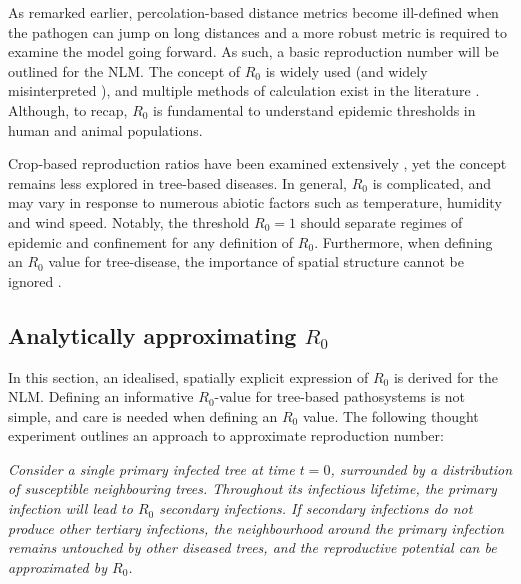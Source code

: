 As remarked earlier, percolation-based distance metrics become ill-defined when the pathogen can jump on long distances and a more robust metric is required to examine the model going forward.
As such, a basic reproduction number will be outlined for the NLM.
The concept of $R_0$ is widely used (and widely misinterpreted \cite{delamater2019complexity}),
and multiple methods of calculation exist in the literature \cite{perspectives-on-r0}.
Although, to recap, $R_0$ is fundamental to understand epidemic thresholds in human and animal populations. 

Crop-based reproduction ratios have been examined extensively
\cite{gubbins2000population, park2001invasion, doi:10.1146/annurev.phyto.011108.135838, van2011periodic},
yet the concept remains less explored in tree-based diseases. 
In general, $R_0$ is complicated, and may vary in response to numerous abiotic factors such as temperature, humidity and wind speed.
Notably, the threshold $R_0=1$ should separate regimes of epidemic and confinement for any definition of $R_0$.
Furthermore, when defining an $R_0$ value for tree-disease, the importance of spatial structure cannot be
ignored \cite{park2001invasion}.


\subsection{Analytically approximating $R_0$}

In this section, an idealised, spatially explicit expression of $R_0$ is derived for the NLM. Defining an informative $R_0$-value for tree-based pathosystems is not simple, and care is needed when defining an $R_0$ value.  
The following thought experiment outlines an approach to approximate reproduction number:

\textit{Consider a single primary infected tree at time $t=0$, surrounded by a distribution of susceptible neighbouring trees. Throughout its infectious lifetime, the primary infection will lead to $R_0$ secondary infections. If secondary infections do not produce other tertiary infections, the neighbourhood around the primary infection remains untouched by other diseased trees, and the reproductive potential can be approximated by $R_0$.}

